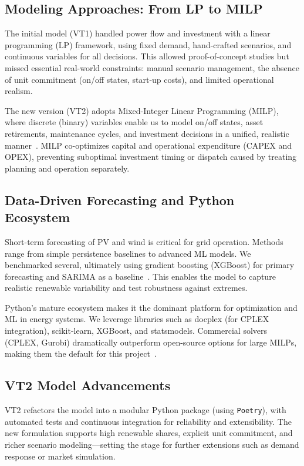 \subsection{Modeling Approaches: From LP to MILP}
The initial model (VT1) handled power flow and investment with a linear programming (LP) framework, using fixed demand, hand-crafted scenarios, and continuous variables for all decisions. This allowed proof-of-concept studies but missed essential real-world constraints: manual scenario management, the absence of unit commitment (on/off states, start-up costs), and limited operational realism.

The new version (VT2) adopts Mixed-Integer Linear Programming (MILP), where discrete (binary) variables enable us to model on/off states, asset retirements, maintenance cycles, and investment decisions in a unified, realistic manner~\cite{andersson2004power, wood2013power}. MILP co-optimizes capital and operational expenditure (CAPEX and OPEX), preventing suboptimal investment timing or dispatch caused by treating planning and operation separately.

\subsection{Data-Driven Forecasting and Python Ecosystem}
Short-term forecasting of PV and wind is critical for grid operation. Methods range from simple persistence baselines to advanced ML models. We benchmarked several, ultimately using gradient boosting (XGBoost) for primary forecasting and SARIMA as a baseline~\cite{grzebyk2021xgboost, zhong2020xgboost}. This enables the model to capture realistic renewable variability and test robustness against extremes.

Python’s mature ecosystem makes it the dominant platform for optimization and ML in energy systems. We leverage libraries such as docplex (for CPLEX integration), scikit-learn, XGBoost, and statsmodels. Commercial solvers (CPLEX, Gurobi) dramatically outperform open-source options for large MILPs, making them the default for this project~\cite{mitchell2011pulp, mittelmann2023benchmarks}.

\subsection{VT2 Model Advancements}
VT2 refactors the model into a modular Python package (using \texttt{Poetry}), with automated tests and continuous integration for reliability and extensibility. The new formulation supports high renewable shares, explicit unit commitment, and richer scenario modeling—setting the stage for further extensions such as demand response or market simulation.
